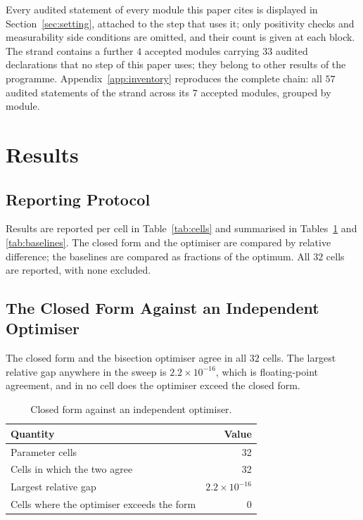 Every audited statement of every module this paper cites is displayed in
Section~\ref{sec:setting}, attached to the step that uses it; only positivity checks and
measurability side conditions are omitted, and their count is given at each block. The
strand contains a further $4$ accepted modules carrying $33$ audited declarations that no
step of this paper uses; they belong to other results of the programme. Appendix~\ref{app:inventory} reproduces the complete chain: all $57$ audited statements of the strand across its $7$ accepted modules, grouped by module.

\section{Results}
\label{sec:results}

\subsection{Reporting Protocol}

Results are reported per cell in Table~\ref{tab:cells} and summarised in
Tables~\ref{tab:numeric} and \ref{tab:baselines}. The closed form and the optimiser are
compared by relative difference; the baselines are compared as fractions of the optimum.
All $32$ cells are reported, with none excluded.

\subsection{The Closed Form Against an Independent Optimiser}

The closed form and the bisection optimiser agree in all $32$ cells. The largest relative
gap anywhere in the sweep is $2.2\times10^{-16}$, which is floating-point agreement, and in
no cell does the optimiser exceed the closed form.

\begin{table}[htbp]
\caption{Closed form against an independent optimiser.}
\label{tab:numeric}
\centering
\begin{tabular}{@{}lr@{}}
\toprule
Quantity & Value \\
\midrule
Parameter cells                            & 32 \\
Cells in which the two agree               & 32 \\
Largest relative gap                       & $2.2\times10^{-16}$ \\
Cells where the optimiser exceeds the form & 0 \\
\bottomrule
\end{tabular}
\end{table}

